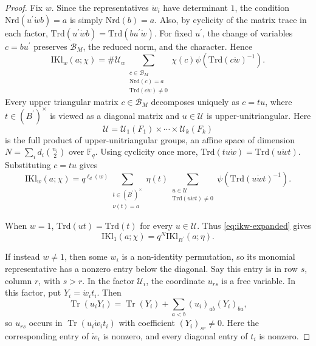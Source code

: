 \documentclass[10pt,a4paper]{amsart}
\newcommand{\IKl}{\mathrm{IKl}}
\newcommand{\Nrd}{\mathrm{Nrd}}
\newcommand{\Trd}{\mathrm{Trd}}
\begin{document}
\begin{proof}
Fix \(w\).  Since the representatives \(\dot w_i\) have determinant
\(1\), the condition \(\Nrd(u^{\prime}\dot w b)=a\) is simply
\(\Nrd(b)=a\).  Also, by cyclicity of the matrix trace in each factor,
\(\Trd(u^{\prime}\dot w b)=\Trd(bu^{\prime}\dot w)\).  For fixed
\(u^{\prime}\), the change of variables \(c=bu^{\prime}\) preserves
\(\mathcal{B}_M\), the reduced norm, and the character.  Hence
\[
\IKl_w(a;\chi)
=
\#\mathcal{U}_w
\sum_{\substack{c\in \mathcal{B}_M\\
    \Nrd(c)=a\\ \Trd(c\dot w)\neq 0}}
\chi(c)\psi(\Trd(c\dot w)^{-1}).
\]
Every upper triangular matrix \(c\in \mathcal{B}_M\) decomposes uniquely
as \(c=tu\), where \(t\in (B^{\prime})^\times\) is viewed as a diagonal
matrix and \(u\in \mathcal{U}\) is upper-unitriangular.  Here
\[
\mathcal{U}=\mathcal{U}_1(F_1)\times\cdots\times \mathcal{U}_k(F_k)
\]
is the full product of upper-unitriangular groups, an affine space of
dimension \(N=\sum_i d_i\binom{n_i}{2}\) over \(\mathbb{F}_q\).  Using
cyclicity once more, \(\Trd(tu\dot w)=\Trd(u\dot w t)\).  Substituting
\(c=tu\) gives
\begin{equation}\label{eq:ikw-expanded}
\IKl_w(a;\chi)
=
q^{\ell_d(w)}
\sum_{\substack{t\in (B^{\prime})^\times\\ \nu(t)=a}}
\eta(t)
\sum_{\substack{u\in \mathcal{U}\\
    \Trd(u\dot w t)\neq 0}}
\psi(\Trd(u\dot w t)^{-1}).
\end{equation}

When \(w=1\), \(\Trd(ut)=\Trd(t)\) for every \(u\in \mathcal{U}\).
Thus \eqref{eq:ikw-expanded} gives
\begin{equation}
\label{eq:w1}
\IKl_1(a;\chi)
=
q^N\IKl_{B^{\prime}}(a;\eta).
\end{equation}

If instead \(w\neq 1\), then some \(w_i\) is a non-identity permutation,
so its monomial representative has a nonzero entry below the diagonal.
Say this entry is in row \(s\), column \(r\), with \(s>r\).  In the
factor \(\mathcal{U}_i\), the coordinate \(u_{rs}\) is a free variable.
In this factor, put \(Y_i=\dot w_i t_i\).  Then
\[
\operatorname{Tr}(u_iY_i)
=
\operatorname{Tr}(Y_i)+\sum_{a<b}(u_i)_{ab}(Y_i)_{ba},
\]
so \(u_{rs}\) occurs in \(\operatorname{Tr}(u_i\dot w_i t_i)\) with
coefficient \((Y_i)_{sr}\neq 0\).  Here the corresponding entry of
\(\dot w_i\) is nonzero, and every diagonal entry of \(t_i\) is nonzero.


\end{proof}
\end{document}
